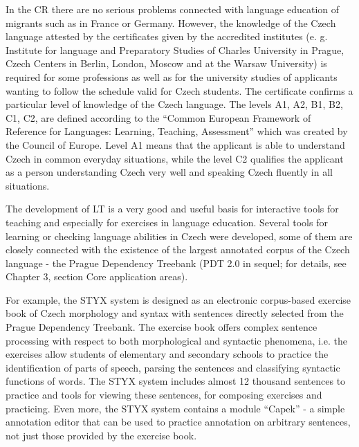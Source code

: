\documentclass[]{../../metanetpaper}
\begin{document}
\begin{multicols}{2}
In the CR there are no serious problems connected with language education of migrants such as in France or Germany. However, the knowledge of the Czech language attested by the certificates given by the accredited institutes (e. g. Institute for language and Preparatory Studies of Charles University in Prague, Czech Centers in Berlin, London, Moscow and at the Warsaw University) is required for some professions as well as for the university studies of applicants wanting to follow the schedule valid for Czech students. The certificate confirms a particular level of knowledge of the Czech language.  The levels A1, A2, B1, B2, C1, C2, are defined according to the “Common European Framework of Reference for Languages: Learning, Teaching, Assessment” which was created by the Council of Europe.\cite{Note7} Level A1 means that the applicant is able to understand Czech in common everyday situations, while the level C2 qualifies the applicant as a person understanding Czech very well and speaking Czech fluently in all situations.

The development of LT is a very good and useful basis for interactive tools for teaching and especially for exercises in language education. Several tools for learning or checking language abilities in Czech were developed, some of them are closely connected with the existence of the largest annotated corpus of the Czech language - the Prague Dependency Treebank (PDT 2.0 in sequel; for details, see Chapter 3, section Core application areas).

For example, the STYX system is designed as an electronic corpus-based exercise book of Czech morphology and syntax with sentences directly selected from the Prague Dependency Treebank. The exercise book offers complex sentence processing with respect to both morphological and syntactic phenomena, i.e. the exercises allow students of elementary and secondary schools to practice the identification of parts of speech, parsing the sentences and classifying syntactic functions of words. The STYX system includes almost 12 thousand sentences to practice and tools for viewing these sentences, for composing exercises and practicing. Even more, the STYX system contains a module “Capek” - a simple annotation editor that can be used to practice annotation on arbitrary sentences, not just those provided by the exercise book.\cite{Note8}


\end{multicols}
\end{document}
